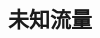 \documentclass{article}
\begin{document}
\begin{CJK}{UTF8}{gbsn}
\section[9-26]{未知流量}



\end{CJK}
\end{document}
